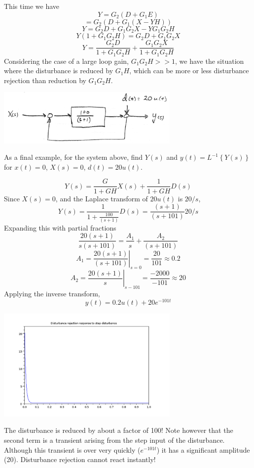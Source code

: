 This time we have
\[
Y = G_2(D+G_1E)
\]
\[
= G_2\left ( D+G_1(X-YH) \right )
\]
\[
Y = G_2D + G_1G_2X - YG_1G_2H
\]
\[
Y(1+G_1G_2H) = G_2D + G_1G_2X
\]
\[
Y = \frac{G_2D}{1+G_1G_2H}  +  \frac{G_1G_2X}{1+G_1G_2H}
\]
Considering the case of a large loop gain, $G_1G_2H >> 1$, we have the situation where the disturbance is reduced by $G_1H$, which can be more or less disturbance rejection than reduction by $G_1G_2H$.





\begin{ExampleSmall}\label{stepdisturbanceexample}

\includegraphics[width=3.5in]{figs06/00778a.png}

As a final example, for the system above, find $Y(s)$ and $y(t) = L^{-1} \left \{ Y(s) \right \}$ for $x(t) = 0$, $X(s) = 0$, $d(t) = 20u(t)$.

\vspace{0.25in}

\[
Y(s) = \frac{G}{1+GH}X(s) +  \frac{1}{1+GH}D(s)
\]
Since $X(s) = 0$, and the Laplace transform of $20u(t)$ is $20/s$,
\[
Y(s) = \frac{1}{1+\frac{100}{(s+1)}} D(s)  = \frac{(s+1)}{(s+101)} 20/s
\]
Expanding this with partial fractions
\[
\frac{20(s+1)}{s(s+101)} =  \frac{A_1}{s} +  \frac{A_2}{(s+101)}
\]
\[
A_1 = \left . \frac{20(s+1)}{(s+101)}\right | _{s=0} = \frac{20}{101} \approx 0.2
\]
\[
A_2 = \left . \frac{20(s+1)}{s}\right | _{s-101} = \frac{-2000}{-101} \approx 20
\]
Applying the inverse transform,
\[
y(t) = 0.2u(t) + 20e^{-101t}
\]

\includegraphics[width=3.5in]{figs06/stepdisturba.png}

The disturbance is reduced by about a factor of 100!   Note however that the second term is a transient arising from the step input of the disturbance.  Although this transient is over very quickly ($e^{-101t}$) it has a significant amplitude (20).   Disturbance rejection cannot react instantly!


\end{ExampleSmall}


